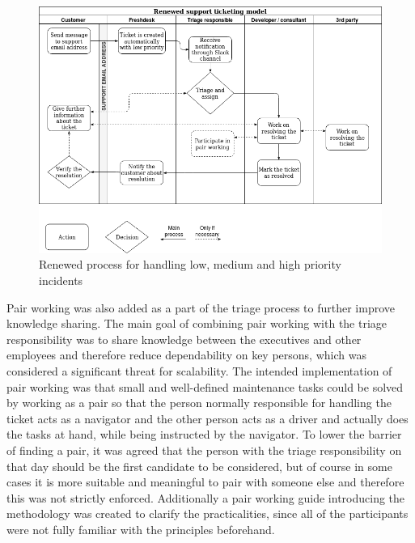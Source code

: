 \begin{figure}[H]
	\begin{center}
		\includegraphics[width=.9\textwidth]{images/Renewed_support_process.png}
		\caption{Renewed process for handling low, medium and high priority incidents}
		\label{fig:ticketing-renewed}
	\end{center}
\end{figure}

Pair working was also added as a part of the triage process to further improve knowledge sharing. The main goal of combining pair working with the triage responsibility was to
share knowledge between the executives and other employees and therefore
reduce dependability on key persons, which was considered a significant threat for scalability. The intended implementation of pair working was that small and well-defined maintenance tasks could be solved by
working as a pair so that the person normally responsible for handling the ticket acts as a navigator and the other person acts as a driver and actually does the tasks at hand, while being instructed by
the navigator. To lower the barrier of finding a pair, it was agreed that the person with the triage responsibility on that day
should be the first candidate to be considered, but of course in some cases it is more suitable and
meaningful to pair with someone else and therefore this was not strictly enforced. Additionally a pair working guide introducing the methodology was created to clarify the practicalities, since all of the
participants were not fully familiar with the principles beforehand.

